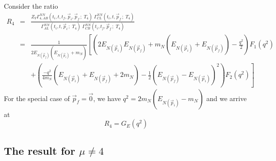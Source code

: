 \documentclass[12pt]{article}
\begin{document}
Consider the ratio
\begin{eqnarray}
R_4 &=& \frac{Z_V
      \Gamma^{NN}_{4,AB}(t_i,t,t_f,\vec p_i,\vec p_f\,;\;T_4)\;
      \Gamma^{NN}_{CL}(t_i,t,\vec p_f\,;\;T_4)}
      {\Gamma^{NN}_{AL}(t_i,t,\vec p_i\,;\;T_4)\;
      \Gamma^{NN}_{CB}(t_i,t_f,\vec p_f\,;\;T_4)} 
      \label{R4def} \\
    &=& \frac{1}{2E_{N(\vec{p}_f)}\left(E_{N(\vec{p}_i)}+m_N\right)}
        \left[
        \left(2E_{N(\vec{p}_i)}E_{N(\vec{p}_f)}+m_N\left(E_{N(\vec{p}_i)}
        +E_{N(\vec{p}_f)}\right)-\frac{q^2}{2}\right)F_1(q^2)
        \right. \nonumber \\
    && \left. +\left(\frac{-q^2}{4m_N}\left(E_{N(\vec{p}_i)}+E_{N(\vec{p}_f)}
        +2m_N\right)-\frac{1}{2}\left(E_{N(\vec{p}_f)}-E_{N(\vec{p}_i)}
        \right)^2\right)F_2(q^2)
        \right] \label{R4}
\end{eqnarray}
For the special case of $\vec p_f=\vec 0$,
we have $q^2=2m_N\left(E_{N(\vec{p}_i)}-m_N\right)$
and we arrive at
\[
R_4 = G_E(q^2)
\]

\subsection{The result for $\mu\neq4$}
\end{document}
